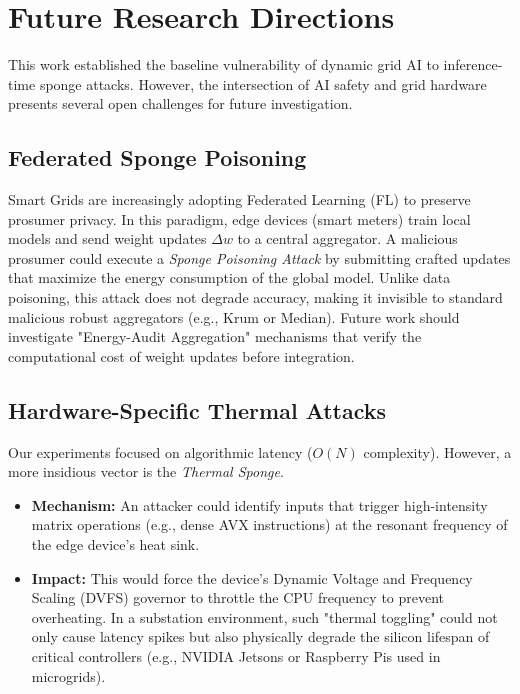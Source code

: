 \section{Future Research Directions}
\label{sec:future}

This work established the baseline vulnerability of dynamic grid AI to inference-time sponge attacks. However, the intersection of AI safety and grid hardware presents several open challenges for future investigation.

\subsection{Federated Sponge Poisoning}
Smart Grids are increasingly adopting Federated Learning (FL) to preserve prosumer privacy. In this paradigm, edge devices (smart meters) train local models and send weight updates $\Delta w$ to a central aggregator.
A malicious prosumer could execute a \textit{Sponge Poisoning Attack} by submitting crafted updates that maximize the energy consumption of the global model. Unlike data poisoning, this attack does not degrade accuracy, making it invisible to standard malicious robust aggregators (e.g., Krum or Median). Future work should investigate "Energy-Audit Aggregation" mechanisms that verify the computational cost of weight updates before integration.

\subsection{Hardware-Specific Thermal Attacks}
Our experiments focused on algorithmic latency ($O(N)$ complexity). However, a more insidious vector is the \textit{Thermal Sponge}.
\begin{itemize}
    \item \textbf{Mechanism:} An attacker could identify inputs that trigger high-intensity matrix operations (e.g., dense AVX instructions) at the resonant frequency of the edge device's heat sink.
    \item \textbf{Impact:} This would force the device's Dynamic Voltage and Frequency Scaling (DVFS) governor to throttle the CPU frequency to prevent overheating. In a substation environment, such "thermal toggling" could not only cause latency spikes but also physically degrade the silicon lifespan of critical controllers (e.g., NVIDIA Jetsons or Raspberry Pis used in microgrids).
\end{itemize}
